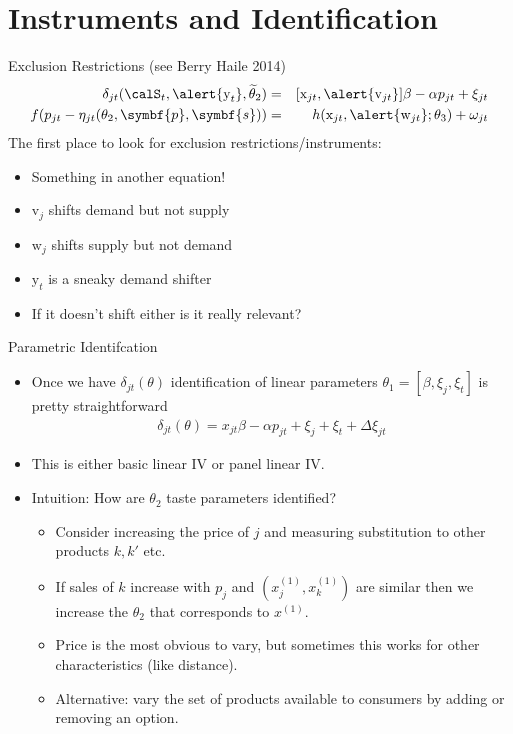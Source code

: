 \section{Instruments and Identification}
\begin{frame}{Exclusion Restrictions (see Berry Haile 2014)}
\begin{eqnarray*}
    \delta_{jt}(\calS_t,\alert{\textrm{y}_t}, \widetilde{\theta}_2) &=&  [\textrm{x}_{jt}, \alert{\textrm{v}_{jt}}]  \beta  - \alpha p_{jt} + \xi_{jt}\\
    f(p_{jt} - \eta_{jt}(\theta_2,\symbf{p},\symbf{s})) &=&   h(\textrm{x}_{jt},\alert{\textrm{w}_{jt}};\theta_3)+\omega_{jt}
\end{eqnarray*}
The first place to look for exclusion restrictions/instruments:
\begin{itemize}
\item Something in another equation!
\item $\textrm{v}_j$ shifts demand but not supply
\item $\textrm{w}_j$ shifts supply but not demand
\item $\textrm{y}_t$ is a sneaky demand shifter
\item If it doesn't shift either is it really relevant?
\end{itemize}
\end{frame}



\begin{frame}{Parametric Identifcation}
\begin{itemize}
\item Once we have $\delta_{jt}(\theta)$ identification of linear parameters $\theta_1=[\beta,\xi_j, \xi_t]$ is pretty straightforward
\begin{eqnarray*}
\delta_{jt}(\theta) = x_{jt} \beta - \alpha p_{jt} + \xi_j + \xi_t + \Delta \xi_{jt}
\end{eqnarray*}
\item This is either basic linear IV or panel linear IV.
\item Intuition: How are $\theta_2$ taste parameters identified?
\begin{itemize}
\item Consider increasing the price of $j$ and measuring substitution to other products $k,k'$ etc.
\item If sales of $k$ increase with $p_j$ and $(x_j^{(1)},x_k^{(1)})$ are similar then we increase the $\theta_2$ that corresponds to $x^{(1)}$.
\item Price is the most obvious to vary, but sometimes this works for other characteristics (like distance).
\item Alternative: vary the set of products available to consumers by adding or removing an option.
\end{itemize}
\end{itemize}
\end{frame}



